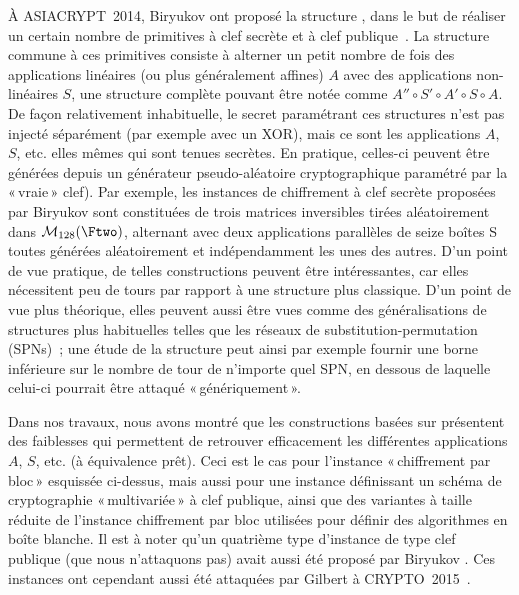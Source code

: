 À ASIACRYPT~2014, Biryukov \etal ont proposé la structure \asasa, dans le but de réaliser un certain nombre de primitives à clef secrète et à clef publique~\cite{DBLP:conf/asiacrypt/BiryukovBK14}.
La structure commune à ces primitives consiste à alterner un petit nombre de fois des applications linéaires (ou plus généralement affines) $A$ avec des applications non-linéaires $S$, une structure
complète pouvant être notée
comme $A'' \circ S' \circ A' \circ S \circ A$. De façon relativement inhabituelle, le secret paramétrant ces structures n'est pas injecté séparément (par exemple avec un XOR), mais ce sont
les applications $A$, $S$, etc. elles mêmes qui sont tenues secrètes.
En pratique, celles-ci peuvent être générées depuis un générateur pseudo-aléatoire cryptographique paramétré par la «\,vraie\,»
clef). Par exemple, les instances \asasa de chiffrement à clef secrète proposées par Biryukov \etal sont constituées de
trois matrices inversibles tirées aléatoirement dans $\mathcal{M}_{128}(\Ftwo)$,
alternant avec deux applications parallèles de seize boîtes S toutes générées aléatoirement et indépendamment les unes des autres.
D'un point de vue pratique, de telles constructions peuvent être intéressantes, car elles nécessitent peu de tours par rapport à une structure plus classique. D'un point de vue plus théorique, elles peuvent
aussi être vues comme des généralisations de structures plus habituelles telles que les réseaux de substitution-permutation (SPNs)~; une étude de la structure \asasa peut ainsi par exemple fournir une borne inférieure sur le nombre de tour
de n'importe quel SPN, en dessous de laquelle celui-ci pourrait être attaqué «\,génériquement\,».

Dans nos travaux, nous avons montré que les constructions basées sur \asasa présentent des faiblesses qui permettent de retrouver efficacement les différentes applications $A$, $S$, etc.
(à équivalence prêt). Ceci est le cas pour l'instance «\,chiffrement par bloc\,» esquissée ci-dessus, mais aussi pour une instance définissant un schéma de cryptographie «\,multivariée\,»
à clef publique, ainsi que des variantes à taille réduite de l'instance chiffrement par bloc utilisées pour définir des algorithmes en boîte blanche.
Il est à noter qu'un quatrième type d'instance de type clef publique (que nous n'attaquons pas) avait aussi été proposé par Biryukov \etal. Ces instances ont cependant aussi été attaquées par
Gilbert \etal à CRYPTO~2015~\cite{DBLP:conf/crypto/GilbertPT15}.
 
